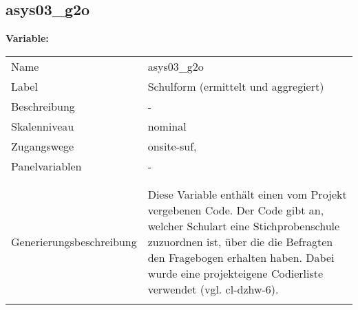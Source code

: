 	
	
	\subsection{asys03\_g2o}
	\label{subSection:asys03_g2o}

	\noindent\textbf{Variable:}\\
		\begin{tabular}{lL{11.3cm}}
			\label{tableVariable:asys03_g2o}
			Name & asys03\_g2o \\
			Label & Schulform (ermittelt und aggregiert) \\
			Beschreibung & - \\
			Skalenniveau & nominal \\
			Zugangswege &
				onsite-suf,
 \\
			Panelvariablen & -
			 \\
			 \\
 \\
					Generierungsbeschreibung & Diese Variable enthält einen vom Projekt vergebenen Code. Der Code gibt an, welcher Schulart eine Stichprobenschule zuzuordnen ist, über die die Befragten den Fragebogen erhalten haben. Dabei wurde eine projekteigene Codierliste verwendet (vgl. cl-dzhw-6).
				 \\	
			 \\
		\end{tabular}






